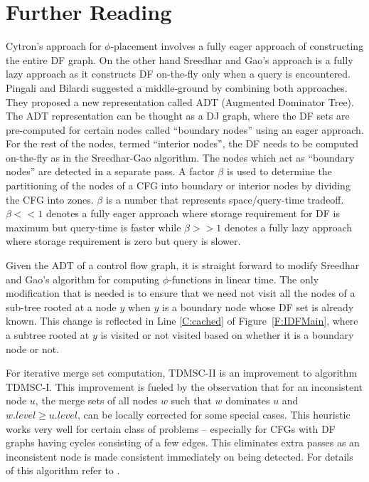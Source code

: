 {\section{Further Reading}
Cytron's approach for $\phi$-placement involves a fully eager approach of constructing the entire DF graph. On the other hand Sreedhar and Gao's approach is a fully lazy approach as it constructs DF on-the-fly only when a query is encountered.
Pingali and Bilardi \cite{bilardi} suggested a middle-ground by combining both approaches. They proposed a new representation called ADT (Augmented Dominator Tree). The ADT representation can be thought as a DJ graph, where the DF sets are pre-computed for certain nodes called ``boundary nodes'' using an eager approach. For the rest of the nodes, termed ``interior nodes'', the DF needs to be computed on-the-fly as in the Sreedhar-Gao algorithm. The nodes which act as ``boundary nodes'' are detected in a separate pass. A factor $\beta$ is used to determine the partitioning of the nodes of a CFG into boundary or interior nodes by dividing the CFG into zones. $\beta$ is a number that represents space/query-time tradeoff. $\beta << 1$ denotes a fully eager approach where storage requirement for DF is maximum but query-time is faster while $\beta >> 1$ denotes a fully lazy approach where storage requirement is zero but query is slower. 

Given the ADT of a control flow graph, it is straight forward to 
modify  Sreedhar and Gao's algorithm for computing $\phi$-functions in linear time. The only modification that is needed is to ensure that we need not visit all the nodes of a sub-tree rooted at a node $y$ when $y$ is a boundary node whose DF set is already known. This change is reflected in Line \ref{C:cached} of Figure~\ref{F:IDFMain}, where a subtree rooted at $y$ is visited or not visited based on whether it is a boundary node or not.

For iterative merge set computation, TDMSC-II is an improvement to algorithm TDMSC-I. This improvement is fueled by the observation that for an inconsistent node $u$, the merge sets of all nodes $w$ such that $w$ dominates $u$ and $w.level \geq u.level$,
can be locally corrected for some special cases. This
heuristic works very well for certain class of problems -- especially for CFGs with DF graphs having cycles consisting of a few edges. This eliminates extra passes as an inconsistent node is made consistent immediately on being detected. For details of this algorithm refer to \cite{das}.


}
